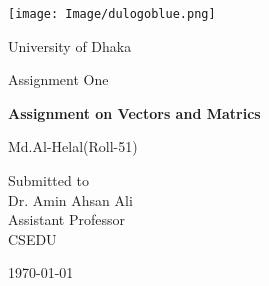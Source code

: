 \documentclass[12pt,a4paper]{report}
\begin{document}
\begin{titlepage}
\centering
\texttt{[image: Image/dulogoblue.png]}\\
{\LARGE University of Dhaka \par}
\vspace{2cm}
{\Large Assignment One\par}
\vspace{2cm}
{\huge\bfseries Assignment on Vectors and Matrics\par}
\vspace{2cm}
{\Large Md.Al-Helal(Roll-51)\par}
\vfill
Submitted to\\
\vspace{0.5cm}
Dr. Amin Ahsan Ali \\ Assistant Professor\\CSEDU
\vfill
{\large \today\par}
\end{titlepage}
\end{document}

